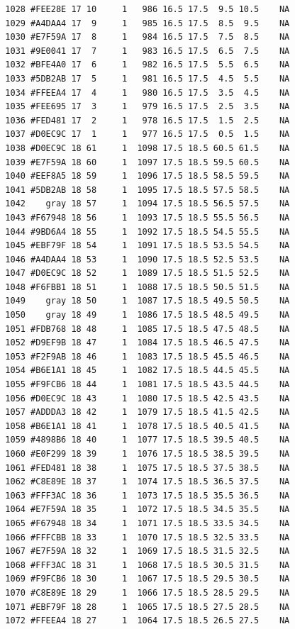 \documentclass[12pt,twoside]{reedthesis}
\begin{document}
\begin{verbatim}
  1028 #FEE28E 17 10     1   986 16.5 17.5  9.5 10.5    NA
  1029 #A4DAA4 17  9     1   985 16.5 17.5  8.5  9.5    NA
  1030 #E7F59A 17  8     1   984 16.5 17.5  7.5  8.5    NA
  1031 #9E0041 17  7     1   983 16.5 17.5  6.5  7.5    NA
  1032 #BFE4A0 17  6     1   982 16.5 17.5  5.5  6.5    NA
  1033 #5DB2AB 17  5     1   981 16.5 17.5  4.5  5.5    NA
  1034 #FFEEA4 17  4     1   980 16.5 17.5  3.5  4.5    NA
  1035 #FEE695 17  3     1   979 16.5 17.5  2.5  3.5    NA
  1036 #FED481 17  2     1   978 16.5 17.5  1.5  2.5    NA
  1037 #D0EC9C 17  1     1   977 16.5 17.5  0.5  1.5    NA
  1038 #D0EC9C 18 61     1  1098 17.5 18.5 60.5 61.5    NA
  1039 #E7F59A 18 60     1  1097 17.5 18.5 59.5 60.5    NA
  1040 #EEF8A5 18 59     1  1096 17.5 18.5 58.5 59.5    NA
  1041 #5DB2AB 18 58     1  1095 17.5 18.5 57.5 58.5    NA
  1042    gray 18 57     1  1094 17.5 18.5 56.5 57.5    NA
  1043 #F67948 18 56     1  1093 17.5 18.5 55.5 56.5    NA
  1044 #9BD6A4 18 55     1  1092 17.5 18.5 54.5 55.5    NA
  1045 #EBF79F 18 54     1  1091 17.5 18.5 53.5 54.5    NA
  1046 #A4DAA4 18 53     1  1090 17.5 18.5 52.5 53.5    NA
  1047 #D0EC9C 18 52     1  1089 17.5 18.5 51.5 52.5    NA
  1048 #F6FBB1 18 51     1  1088 17.5 18.5 50.5 51.5    NA
  1049    gray 18 50     1  1087 17.5 18.5 49.5 50.5    NA
  1050    gray 18 49     1  1086 17.5 18.5 48.5 49.5    NA
  1051 #FDB768 18 48     1  1085 17.5 18.5 47.5 48.5    NA
  1052 #D9EF9B 18 47     1  1084 17.5 18.5 46.5 47.5    NA
  1053 #F2F9AB 18 46     1  1083 17.5 18.5 45.5 46.5    NA
  1054 #B6E1A1 18 45     1  1082 17.5 18.5 44.5 45.5    NA
  1055 #F9FCB6 18 44     1  1081 17.5 18.5 43.5 44.5    NA
  1056 #D0EC9C 18 43     1  1080 17.5 18.5 42.5 43.5    NA
  1057 #ADDDA3 18 42     1  1079 17.5 18.5 41.5 42.5    NA
  1058 #B6E1A1 18 41     1  1078 17.5 18.5 40.5 41.5    NA
  1059 #4898B6 18 40     1  1077 17.5 18.5 39.5 40.5    NA
  1060 #E0F299 18 39     1  1076 17.5 18.5 38.5 39.5    NA
  1061 #FED481 18 38     1  1075 17.5 18.5 37.5 38.5    NA
  1062 #C8E89E 18 37     1  1074 17.5 18.5 36.5 37.5    NA
  1063 #FFF3AC 18 36     1  1073 17.5 18.5 35.5 36.5    NA
  1064 #E7F59A 18 35     1  1072 17.5 18.5 34.5 35.5    NA
  1065 #F67948 18 34     1  1071 17.5 18.5 33.5 34.5    NA
  1066 #FFFCBB 18 33     1  1070 17.5 18.5 32.5 33.5    NA
  1067 #E7F59A 18 32     1  1069 17.5 18.5 31.5 32.5    NA
  1068 #FFF3AC 18 31     1  1068 17.5 18.5 30.5 31.5    NA
  1069 #F9FCB6 18 30     1  1067 17.5 18.5 29.5 30.5    NA
  1070 #C8E89E 18 29     1  1066 17.5 18.5 28.5 29.5    NA
  1071 #EBF79F 18 28     1  1065 17.5 18.5 27.5 28.5    NA
  1072 #FFEEA4 18 27     1  1064 17.5 18.5 26.5 27.5    NA

\end{verbatim}
\end{document}
